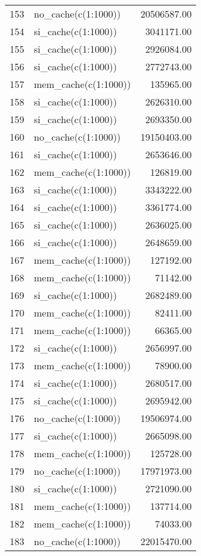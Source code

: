 \begin{table}[ht]
\begin{tabular}{rlr}
  153 & no\_cache(c(1:1000)) & 20506587.00 \\ 
  154 & si\_cache(c(1:1000)) & 3041171.00 \\ 
  155 & si\_cache(c(1:1000)) & 2926084.00 \\ 
  156 & si\_cache(c(1:1000)) & 2772743.00 \\ 
  157 & mem\_cache(c(1:1000)) & 135965.00 \\ 
  158 & si\_cache(c(1:1000)) & 2626310.00 \\ 
  159 & si\_cache(c(1:1000)) & 2693350.00 \\ 
  160 & no\_cache(c(1:1000)) & 19150403.00 \\ 
  161 & si\_cache(c(1:1000)) & 2653646.00 \\ 
  162 & mem\_cache(c(1:1000)) & 126819.00 \\ 
  163 & si\_cache(c(1:1000)) & 3343222.00 \\ 
  164 & si\_cache(c(1:1000)) & 3361774.00 \\ 
  165 & si\_cache(c(1:1000)) & 2636025.00 \\ 
  166 & si\_cache(c(1:1000)) & 2648659.00 \\ 
  167 & mem\_cache(c(1:1000)) & 127192.00 \\ 
  168 & mem\_cache(c(1:1000)) & 71142.00 \\ 
  169 & si\_cache(c(1:1000)) & 2682489.00 \\ 
  170 & mem\_cache(c(1:1000)) & 82411.00 \\ 
  171 & mem\_cache(c(1:1000)) & 66365.00 \\ 
  172 & si\_cache(c(1:1000)) & 2656997.00 \\ 
  173 & mem\_cache(c(1:1000)) & 78900.00 \\ 
  174 & si\_cache(c(1:1000)) & 2680517.00 \\ 
  175 & si\_cache(c(1:1000)) & 2695942.00 \\ 
  176 & no\_cache(c(1:1000)) & 19506974.00 \\ 
  177 & si\_cache(c(1:1000)) & 2665098.00 \\ 
  178 & mem\_cache(c(1:1000)) & 125728.00 \\ 
  179 & no\_cache(c(1:1000)) & 17971973.00 \\ 
  180 & si\_cache(c(1:1000)) & 2721090.00 \\ 
  181 & mem\_cache(c(1:1000)) & 137714.00 \\ 
  182 & mem\_cache(c(1:1000)) & 74033.00 \\ 
  183 & no\_cache(c(1:1000)) & 22015470.00 \\ 

\end{tabular}
\end{table}
